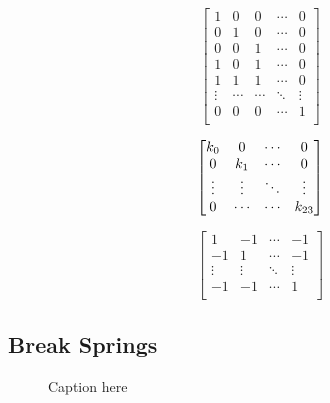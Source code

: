 \begin{equation}\label{eq:implementation:adjacency}
	\begin{bmatrix}
		1 		& 0 		& 0 		& \cdots 	& 0\\
		0 		& 1 		& 0 		& \cdots 	& 0\\
		0 		& 0 		& 1 		& \cdots 	& 0\\
		1 		& 0 		& 1 		& \cdots 	& 0\\
		1 		& 1 		& 1 		& \cdots 	& 0\\
		\vdots	& \cdots 	& \cdots 	& \ddots 	& \vdots\\
		0 		& 0 		& 0 		& \cdots 	& 1\\
	\end{bmatrix}
\end{equation}

\begin{equation}\label{eq:implementation:springConstantMatrix}
	\begin{bmatrix}
		k_{0} 	& 0 			& \cdots & 0\\
		0 			& k_{1}	& \cdots & 0\\	
		\vdots 		& \vdots		& \ddots & \vdots\\
		0 			& \cdots		& \cdots & k_{23}\\
	\end{bmatrix}
\end{equation}

\begin{equation}\label{eq:implementation:correctionMatrix}
	\begin{bmatrix}
		1 			& -1 			& \cdots & -1\\
		-1 			& 1				& \cdots & -1\\	
		\vdots 		& \vdots		& \ddots & \vdots\\
		-1 			& -1			& \cdots & 1\\		
	\end{bmatrix}
\end{equation}


\subsection{Break Springs}

\begin{figure}
	\centering
	\resizebox{0.9\columnwidth}{!}{%
		\initialGrid
	}
	\caption{Caption here}
	\label{fig:1:}
\end{figure}

